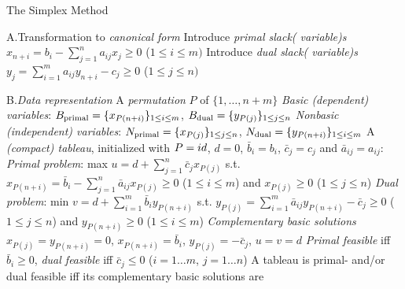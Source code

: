 \beginsection The Simplex Method

\item{A.}Transformation to \emph{canonical form}\smallskip
{}Introduce \emph{primal slack( variable)s} $x_{n+i}=b_i-\sum_{j=1}^n
a_{ij}x_j\geq 0$ ($1\leq i\leq m)$\smallskip
{}Introduce \emph{dual slack( variable)s} $y_{j}=\sum_{i=1}^m
a_{ij}y_{n+i}-c_j\geq 0$ ($1\leq j\leq n)$\smallskip

\item{B.}\emph{Data representation}\smallskip
{}A \emph{permutation} $P$ of $\{1,\ldots,n+m\}$\smallskip
{}\emph{Basic (dependent) variables}: ${\sl B}_{\rm primal}=\{
x_{P(n+i)}\}_{1\leq i\leq m}$, ${\sl B}_{\rm dual}=\{ y_{P(j)}\}_{1\leq j\leq
n}$\smallskip
{}\emph{Nonbasic (independent) variables}: ${\sl N}_{\rm primal}=\{
x_{P(j)}\}_{1\leq j\leq n}$, ${\sl N}_{\rm dual}=\{ y_{P(n+i)}\}_{1\leq i\leq
m}$\smallskip
{}A \emph{(compact) tableau}, initialized with $P={\sl id}$, $d=0$,
$\bar{b}_i=b_i$, $\bar{c}_j=c_j$ and $\bar{a}_{ij}=a_{ij}$:\smallskip
\iitem{}\vbox{\offinterlineskip
}\smallskip
{}\emph{Primal problem}: max $u=d+\sum_{j=1}^n\bar{c}_jx_{P(j)}$ s.t.
$x_{P(n+i)}=\bar{b}_i-\sum_{j=1}^n\bar{a}_{ij}x_{P(j)}\geq 0$ ($1\leq i\leq m$)
and $x_{P(j)}\geq 0$ ($1\leq j\leq n$)\smallskip
{}\emph{Dual problem}: min
$v=d+\sum_{i=1}^m\bar{b}_iy_{P(n+i)}$ s.t.
$y_{P(j)}=\sum_{i=1}^m\bar{a}_{ij}y_{P(n+i)}-\bar{c}_j\geq 0$ ($1\leq j\leq n$)
and $y_{P(n+i)}\geq 0$ ($1\leq i\leq m$)\smallskip
{}\emph{Complementary basic solutions} $x_{P(j)}=y_{P(n+i)}=0$,
$x_{P(n+i)}=\bar{b}_i$, $y_{P(j)}=-\bar{c}_j$, $u=v=d$
\smallskip
{}\emph{Primal feasible} iff $\bar{b}_i\geq 0$, \emph{dual feasible}
iff $\bar{c}_j\leq 0$ ($i=1\ldots m$,  $j=1\ldots n$)\smallskip
{}A tableau is primal- and/or dual feasible iff its complementary
basic solutions are\smallskip

